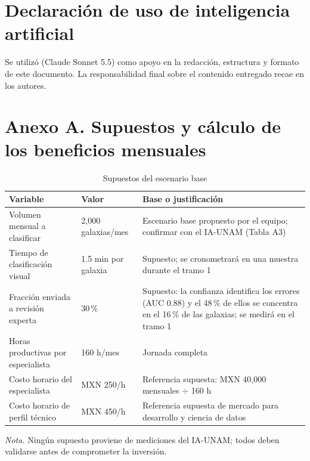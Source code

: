 \documentclass[letterpaper,11pt]{article}
\newcommand{\nota}[1]{{\footnotesize\textit{Nota.} #1\par}}
\begin{document}
\section*{Declaración de uso de inteligencia artificial}
Se utilizó \textcite{anthropic2026claude} (Claude Sonnet 5.5) como apoyo en la redacción, estructura y formato de este documento. La responsabilidad final sobre el contenido entregado recae en los autores.

\printbibliography[title={Referencias}]

\clearpage
\section*{Anexo A. Supuestos y cálculo de los beneficios mensuales}
\renewcommand{\thetable}{A\arabic{table}}\setcounter{table}{0}
\begin{table}[!ht]
\caption{Supuestos del escenario base}
\small
\begin{tabular}{@{}p{4cm}p{3cm}p{8.5cm}@{}}
\toprule
Variable & Valor & Base o justificación\\
\midrule
Volumen mensual a clasificar & 2,000 galaxias/mes & Escenario base propuesto por el equipo; confirmar con el IA-UNAM (Tabla A3)\\
Tiempo de clasificación visual & 1.5 min por galaxia & Supuesto; se cronometrará en una muestra durante el tramo 1\\
Fracción enviada a revisión experta & 30\,\% & Supuesto: la confianza identifica los errores (AUC 0.88) y el 48\,\% de ellos se concentra en el 16\,\% de las galaxias; se medirá en el tramo 1\\
Horas productivas por especialista & 160 h/mes & Jornada completa\\
Costo horario del especialista & MXN 250/h & Referencia supuesta: MXN 40,000 mensuales $\div$ 160 h\\
Costo horario de perfil técnico & MXN 450/h & Referencia supuesta de mercado para desarrollo y ciencia de datos\\
\bottomrule
\end{tabular}
\nota{Ningún supuesto proviene de mediciones del IA-UNAM; todos deben validarse antes de comprometer la inversión.}
\end{table}
\end{document}

